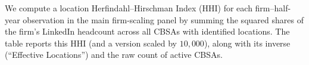 \documentclass{article}
\begin{document}
\noindent We compute a location Herfindahl--Hirschman Index (HHI) for each firm--half-year observation in the main firm-scaling panel by summing the squared shares of the firm's LinkedIn headcount across all CBSAs with identified locations. The table reports this HHI (and a version scaled by $10{,}000$), along with its inverse (``Effective Locations'') and the raw count of active CBSAs.

\end{document}
